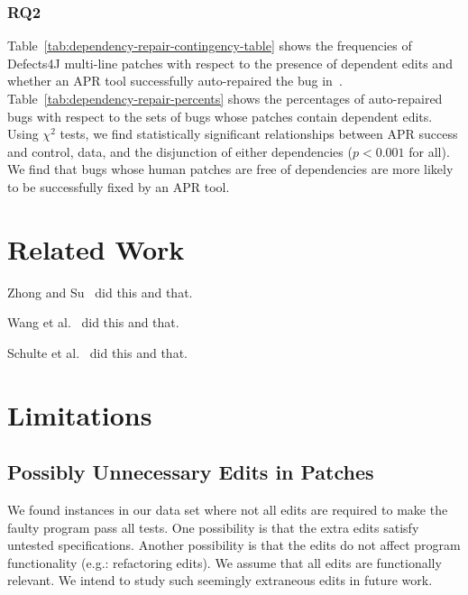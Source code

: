 \documentclass[sigconf, timestamp-false, anonymous=true]{acmart}
\begin{document}
\subsubsection{RQ2} 

Table~\ref{tab:dependency-repair-contingency-table} shows
the frequencies of Defects4J multi-line patches with respect to the presence of 
dependent edits and whether an APR tool successfully auto-repaired the bug in~\cite{durieux-repair-them-all}.
Table~\ref{tab:dependency-repair-percents} shows the percentages of 
auto-repaired bugs with respect to the sets of bugs whose patches contain 
dependent edits.
Using $\chi^2$ tests, we find statistically significant relationships between APR  
success and control, data, and the disjunction of either dependencies 
($p < 0.001$ for all).
We find that bugs whose human patches are free of dependencies are
more likely to be successfully fixed by an APR tool.




\section{Related Work}
Zhong and Su~\cite{zhong2015} did this and that.

Wang et al.~\cite{wang2018} did this and that.

Schulte et al.~\cite{schulte} did this and that.

\section{Limitations}

\subsection{Possibly Unnecessary Edits in Patches}

We found instances in our data set where not all edits are required to 
make the faulty program pass all tests. One possibility is that the extra 
edits satisfy untested specifications. Another possibility is that the edits 
do not affect program functionality (e.g.: refactoring edits). We assume 
that all edits are functionally relevant. We intend to study such seemingly
extraneous edits in future work.



\end{document}
